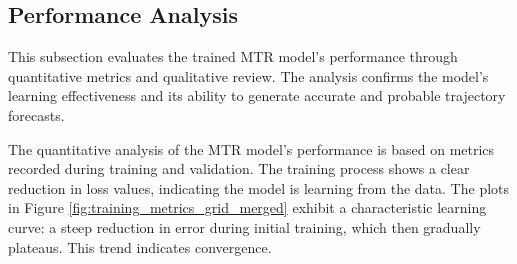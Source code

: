\subsection{Performance Analysis}
\label{sec:performance_analysis_merged}
This subsection evaluates the trained MTR model's performance through quantitative metrics and qualitative review. The analysis confirms the model's learning effectiveness and its ability to generate accurate and probable trajectory forecasts.

\label{sec:results_quantitative_merged}

The quantitative analysis of the MTR model's performance is based on metrics recorded during training and validation. The training process shows a clear reduction in loss values, indicating the model is learning from the data. The plots in Figure \ref{fig:training_metrics_grid_merged} exhibit a characteristic learning curve: a steep reduction in error during initial training, which then gradually plateaus. This trend indicates convergence.

